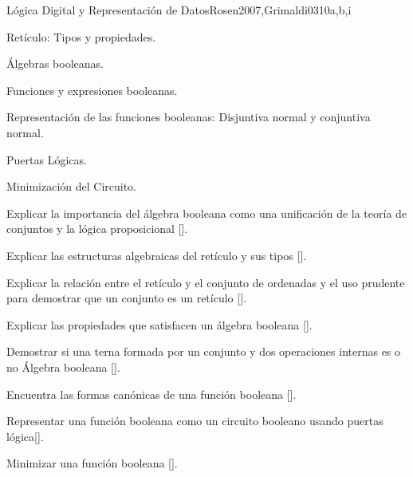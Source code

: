 \begin{syllabus}
\begin{unit}{Lógica Digital y Representación de Datos}{}{Rosen2007,Grimaldi03}{10}{a,b,i}
    \begin{topics}
         \item Retículo: Tipos y propiedades.
         \item Álgebras booleanas.
         \item Funciones y expresiones booleanas.
         \item Representación de las funciones booleanas: Disjuntiva normal y conjuntiva normal.
         \item Puertas Lógicas.
         \item Minimización del Circuito.
    \end{topics}
     \begin{learningoutcomes}
         \item Explicar la importancia del álgebra booleana como una unificación de la teoría de conjuntos y la lógica proposicional [\Assessment].
         \item Explicar las estructuras algebraicas del retículo y sus tipos [\Assessment].
         \item Explicar la relación entre el retículo y el conjunto de ordenadas y el uso prudente para demostrar que un conjunto es un retículo [\Assessment].
         \item Explicar las propiedades que satisfacen un álgebra booleana [\Assessment].
         \item Demostrar si una terna formada por un conjunto y dos operaciones internas es o no Álgebra booleana [\Assessment].
         \item Encuentra las formas canónicas de una función booleana  [\Assessment].
         \item Representar una función booleana como un circuito booleano usando puertas lógica[\Assessment].
         \item Minimizar una función booleana [\Assessment].
     \end{learningoutcomes}
 \end{unit}


\end{syllabus}
